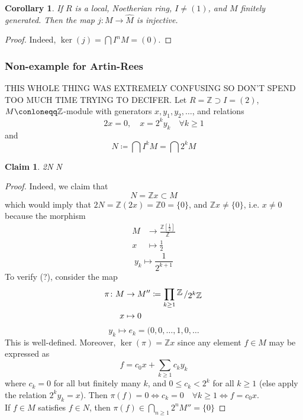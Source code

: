 \documentclass[12pt]{article}
\newcommand{\z}{\mathbb{Z}}
\newcommand{\bigslant}[2]{{\raisebox{.2em}{$#1$}\left/\raisebox{-.2em}{$#2$}\right.}}
\newcommand{\mapping}[5]{\begin{align*}
#1\colon #2 &\to #3\\
#4 & \mapsto #5
\end{align*}}
\newcommand{\mapp}[4]{\begin{align*}
#1 &\to #2\\
#3 & \mapsto #4
\end{align*}}
\newtheorem{corollary}[theorem]{Corollary}
\newtheorem*{claim}{Claim}
\theoremstyle{definition}
\begin{document}
\begin{corollary}
If $R$ is a local, Noetherian ring, $I \neq (1)$, and $M$ finitely generated. Then the map $j:M\rightarrow \hat{M}$ is injective.

\end{corollary}
\begin{proof}
Indeed, $\ker(j) = \bigcap I^nM = (0)$.
\end{proof}
\subsubsection*{Non-example for Artin-Rees}
THIS WHOLE THING WAS EXTREMELY CONFUSING SO DON'T SPEND TOO MUCH TIME TRYING TO DECIFER.
Let $R = \z\supset I = (2)$, $M \conloneqq \z$-module with generators $x,y_1, y_2,\dots $, and relations
\[
2x=0, \quad x=2^ky_k \quad \forall k\geq 1
\]
and
\[
N \coloneqq \bigcap I^kM = \bigcap 2^k M
\]
\begin{claim}
2N \neq N
\end{claim}
\begin{proof}
Indeed, we claim that 
\begin{equation}
  N = \z x \subset M  
\end{equation}
which would imply that $2N = \z (2x) = \z 0 = \{0\}$, and $\z x \neq \{0\}$, i.e. $x\neq 0$ because the morphism
\[
\mapp{M}{\frac{\z [\frac{1}{2}]}{\z}}{x}{\frac{1}{2}}
\]
\[
y_k \mapsto \frac{1}{2^{k+1}}
\]
To verify (?), consider the map 
\[
\mapping{\pi}{M}{M''\coloneqq \prod_{k\geq 1}\bigslant{\z}{2^k\z}}{x}{0}
\]
\[
y_k \mapsto e_k = (0,0,\dots, 1,0,\dots
\]
This is well-defined. Moreover, $\ker(\pi) = \z x$ since any element $f\in M$ may be expressed as 
\[
f = c_0x + \sum_{k\geq 1} c_ky_k
\]
where $c_k =0 $ for all but finitely many $k$, and $0\leq c_k < 2^k$ for all $k\geq 1$ (else apply the relation $2^ky_k =x$). Then $\pi(f) = 0 \Leftrightarrow c_k = 0 \quad \forall k\geq 1 \Leftrightarrow f = c_0x$.\\
If $f\in M $ satisfies $f\in N$, then $\pi(f) \in \bigcap_{n\geq 1}2^nM'' = \{0\}$
\end{proof}
\date{15.11.2018}
\end{document}
